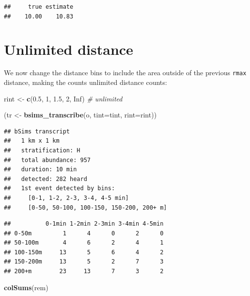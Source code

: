 \documentclass[12pt,]{book}
\newenvironment{Shaded}{\begin{snugshade}}{\end{snugshade}}
\newcommand{\CommentTok}[1]{\textcolor[rgb]{0.56,0.35,0.01}{\textit{#1}}}
\newcommand{\DataTypeTok}[1]{\textcolor[rgb]{0.13,0.29,0.53}{#1}}
\newcommand{\DecValTok}[1]{\textcolor[rgb]{0.00,0.00,0.81}{#1}}
\newcommand{\FloatTok}[1]{\textcolor[rgb]{0.00,0.00,0.81}{#1}}
\newcommand{\KeywordTok}[1]{\textcolor[rgb]{0.13,0.29,0.53}{\textbf{#1}}}
\newcommand{\NormalTok}[1]{#1}
\newcommand{\OperatorTok}[1]{\textcolor[rgb]{0.81,0.36,0.00}{\textbf{#1}}}
\newcommand{\OtherTok}[1]{\textcolor[rgb]{0.56,0.35,0.01}{#1}}
\newcommand{\StringTok}[1]{\textcolor[rgb]{0.31,0.60,0.02}{#1}}
\begin{document}
\begin{verbatim}
##     true estimate 
##    10.00    10.83
\end{verbatim}

\hypertarget{unlimited-distance}{%
\section{Unlimited distance}\label{unlimited-distance}}

We now change the distance bins to include the area outside of the
previous \texttt{rmax} distance, making the counts unlimited distance counts:

\begin{Shaded}
\begin{Highlighting}[]
\NormalTok{rint <-}\StringTok{ }\KeywordTok{c}\NormalTok{(}\FloatTok{0.5}\NormalTok{, }\DecValTok{1}\NormalTok{, }\FloatTok{1.5}\NormalTok{, }\DecValTok{2}\NormalTok{, }\OtherTok{Inf}\NormalTok{) }\CommentTok{# unlimited}

\NormalTok{(tr <-}\StringTok{ }\KeywordTok{bsims_transcribe}\NormalTok{(o, }\DataTypeTok{tint=}\NormalTok{tint, }\DataTypeTok{rint=}\NormalTok{rint))}
\end{Highlighting}
\end{Shaded}

\begin{verbatim}
## bSims transcript
##   1 km x 1 km
##   stratification: H
##   total abundance: 957
##   duration: 10 min
##   detected: 282 heard
##   1st event detected by bins:
##     [0-1, 1-2, 2-3, 3-4, 4-5 min]
##     [0-50, 50-100, 100-150, 150-200, 200+ m]
\end{verbatim}

\begin{Shaded}
\end{Shaded}

\begin{verbatim}
##          0-1min 1-2min 2-3min 3-4min 4-5min
## 0-50m         1      4      0      2      0
## 50-100m       4      6      2      4      1
## 100-150m     13      5      6      4      2
## 150-200m     13      5      2      7      3
## 200+m        23     13      7      3      2
\end{verbatim}

\begin{Shaded}
\begin{Highlighting}[]
\KeywordTok{colSums}\NormalTok{(rem)}
\end{Highlighting}
\end{Shaded}
\end{document}
